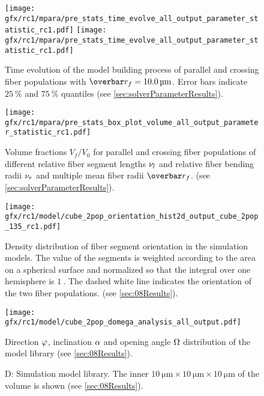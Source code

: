 %
\begin{sidewaysfigure}[!p]
    \centering
    \texttt{[image: gfx/rc1/mpara/pre\_stats\_time\_evolve\_all\_output\_parameter\_statistic\_rc1.pdf]}
    \texttt{[image: gfx/rc1/mpara/pre\_stats\_time\_evolve\_all\_output\_parameter\_statistic\_rc1.pdf]}
    \label{app:pste5}
    \caption{Time evolution of the model building process of parallel and crossing fiber populations with $\fiberRadiusMean=\SI{10.0}{\micro\meter}$. Error bars indicate $\SI{25}{\percent}$ and $\SI{75}{\percent}$ quantiles (see \cref{sec:solverParameterResults}).}
\end{sidewaysfigure}
% 
\begin{figure}[!p]
    \centering
    \texttt{[image: gfx/rc1/mpara/pre\_stats\_box\_plot\_volume\_all\_output\_parameter\_statistic\_rc1.pdf]}
    \caption[]{Volume fractions $V_f/V_0$ for parallel \pfbs{} and crossing \cfbs{} fiber populations of different relative fiber segment lengths $\textnormal{$\nu_{l}$}$ and relative fiber bending radii $\textnormal{$\nu_{r}$}$ and multiple mean fiber radii $\fiberRadiusMean$. (see \cref{sec:solverParameterResults}).}
    \label{app:appModelVolumeBoxPlot}
\end{figure}
%
\begin{figure}[!p]
    \centering
    \texttt{[image: gfx/rc1/model/cube\_2pop\_orientation\_hist2d\_output\_cube\_2pop\_135\_rc1.pdf]}
    \caption[]{Density distribution of fiber segment orientation in the simulation models.
    The value of the segments is weighted according to the area on a spherical surface and normalized so that the integral over one hemisphere is $\SI{1}{}$.
    The dashed white line indicates the orientation of the two fiber populations. (see \cref{sec:08Results}).}
    \label{app:modelOrientation}
\end{figure}
%
\begin{figure}[!p]
    \centering
    \texttt{[image: gfx/rc1/model/cube\_2pop\_domega\_analysis\_all\_output.pdf]}
    \caption[]{Direction $\textnormal{$\varphi$}$, inclination $\textnormal{$\alpha$}$ and opening angle $\textnormal{$\Omega$}$ distribution of the model library (see \cref{sec:08Results}).}
    \label{app:modelAngleBoxPlot}
\end{figure}
%
\begin{figure}[!p]
    \centering
    \caption[]{D: Simulation model library. The inner $\SI{10}{\micro\meter} \times \SI{10}{\micro\meter} \times \SI{10}{\micro\meter}$ of the volume is shown (see \cref{sec:08Results}).}
    \label{app:modelImages}
\end{figure}
